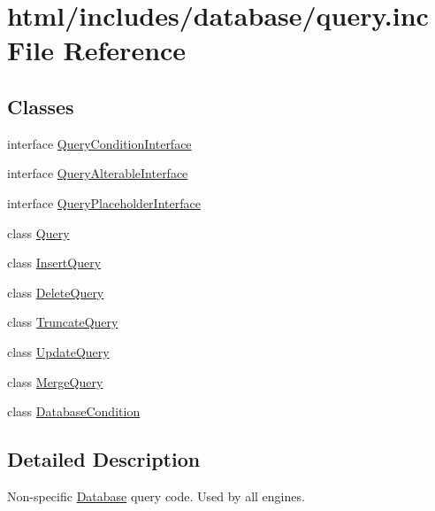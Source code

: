 \hypertarget{query_8inc}{
\section{html/includes/database/query.inc File Reference}
\label{query_8inc}
}
\subsection*{Classes}
\begin{DoxyCompactItemize}
\item 
interface \hyperlink{interfaceQueryConditionInterface}{QueryConditionInterface}
\item 
interface \hyperlink{interfaceQueryAlterableInterface}{QueryAlterableInterface}
\item 
interface \hyperlink{interfaceQueryPlaceholderInterface}{QueryPlaceholderInterface}
\item 
class \hyperlink{classQuery}{Query}
\item 
class \hyperlink{classInsertQuery}{InsertQuery}
\item 
class \hyperlink{classDeleteQuery}{DeleteQuery}
\item 
class \hyperlink{classTruncateQuery}{TruncateQuery}
\item 
class \hyperlink{classUpdateQuery}{UpdateQuery}
\item 
class \hyperlink{classMergeQuery}{MergeQuery}
\item 
class \hyperlink{classDatabaseCondition}{DatabaseCondition}
\end{DoxyCompactItemize}


\subsection{Detailed Description}
Non-\/specific \hyperlink{classDatabase}{Database} query code. Used by all engines. 